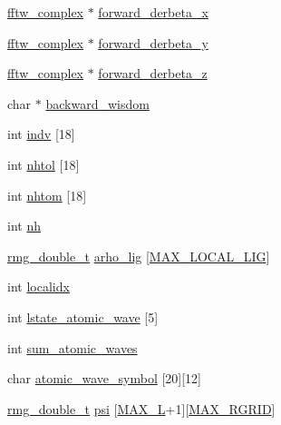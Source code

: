 \begin{DoxyCompactItemize}
\item 
\hyperlink{structfftw__complex}{fftw\-\_\-complex} $\ast$ \hyperlink{struct_s_p_e_c_i_e_s_aada2e8ffba79b9c0d13137ff6315ee38}{forward\-\_\-derbeta\-\_\-x}
\item 
\hyperlink{structfftw__complex}{fftw\-\_\-complex} $\ast$ \hyperlink{struct_s_p_e_c_i_e_s_acd36a9b210e49b6a582d6045af8431b6}{forward\-\_\-derbeta\-\_\-y}
\item 
\hyperlink{structfftw__complex}{fftw\-\_\-complex} $\ast$ \hyperlink{struct_s_p_e_c_i_e_s_ad8079057de16e57dec1c2491947c9725}{forward\-\_\-derbeta\-\_\-z}
\item 
char $\ast$ \hyperlink{struct_s_p_e_c_i_e_s_a60126e16e5a75b1140279e08ee5bab48}{backward\-\_\-wisdom}
\item 
int \hyperlink{struct_s_p_e_c_i_e_s_a84db83be3a09074dd5fd9f95aa666749}{indv} \mbox{[}18\mbox{]}
\item 
int \hyperlink{struct_s_p_e_c_i_e_s_a3bcbfcd54b0674aca4d4a5f6aaeb56ce}{nhtol} \mbox{[}18\mbox{]}
\item 
int \hyperlink{struct_s_p_e_c_i_e_s_a6daf9d30c2575e072faae677faf82a87}{nhtom} \mbox{[}18\mbox{]}
\item 
int \hyperlink{struct_s_p_e_c_i_e_s_aa85a125d090a81022c34cf41089e2304}{nh}
\item 
\hyperlink{rmgtypes_8h_aaa16921c14f121c56eaa42390a340db8}{rmg\-\_\-double\-\_\-t} \hyperlink{struct_s_p_e_c_i_e_s_a6ddb2b72bf468dca0af086658cc8b230}{arho\-\_\-lig} \mbox{[}\hyperlink{_t_d_d_f_t_2_headers_2params_8h_aa0d2d7cede5d9d8023a3dcb8861a3511}{M\-A\-X\-\_\-\-L\-O\-C\-A\-L\-\_\-\-L\-I\-G}\mbox{]}
\item 
int \hyperlink{struct_s_p_e_c_i_e_s_a7ce40558b1b938ab276356e0e4d5e252}{localidx}
\item 
int \hyperlink{struct_s_p_e_c_i_e_s_aad27e3cedb65a613cd1af4129c69ff75}{lstate\-\_\-atomic\-\_\-wave} \mbox{[}5\mbox{]}
\item 
int \hyperlink{struct_s_p_e_c_i_e_s_aeaad1e35d2cdd877af4964b426a0dba8}{sum\-\_\-atomic\-\_\-waves}
\item 
char \hyperlink{struct_s_p_e_c_i_e_s_ad020b54d5e4a55b893d30240a766f4db}{atomic\-\_\-wave\-\_\-symbol} \mbox{[}20\mbox{]}\mbox{[}12\mbox{]}
\item 
\hyperlink{rmgtypes_8h_aaa16921c14f121c56eaa42390a340db8}{rmg\-\_\-double\-\_\-t} \hyperlink{struct_s_p_e_c_i_e_s_aeee83a5790fac1a019e1bfec0c867007}{psi} \mbox{[}\hyperlink{_t_d_d_f_t_2_headers_2params_8h_adf2a0717e3307419a9d7c52707f5631e}{M\-A\-X\-\_\-\-L}+1\mbox{]}\mbox{[}\hyperlink{_t_d_d_f_t_2_headers_2params_8h_a42463a14fd24ed3f2b00fff22236b237}{M\-A\-X\-\_\-\-R\-G\-R\-I\-D}\mbox{]}

\end{DoxyCompactItemize}
